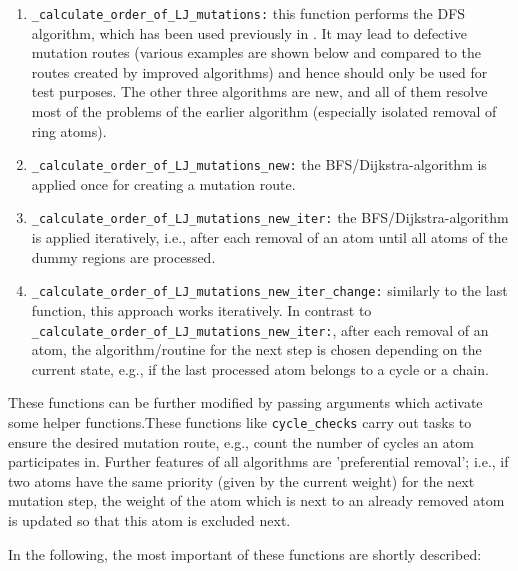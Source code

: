 \begin{enumerate}
\item \texttt{\_calculate\_order\_of\_LJ\_mutations:} this function performs the DFS algorithm, which has been used previously in {\trafo}. It may lead to  defective mutation routes (various examples are shown below and compared to the routes created by improved algorithms) and hence
should only be used for test purposes. The other three algorithms
are new, and all of them resolve most of the problems of the earlier
algorithm (especially isolated removal of ring atoms).


\item \texttt{\_calculate\_order\_of\_LJ\_mutations\_new:} the BFS/Dijkstra-algorithm is
applied once for creating a mutation route.

\item \texttt{\_calculate\_order\_of\_LJ\_mutations\_new\_iter:} the BFS/Dijkstra-algorithm is
applied iteratively, i.e., after each removal of an atom until all atoms of the dummy regions are processed.

\item \texttt{\_calculate\_order\_of\_LJ\_mutations\_new\_iter\_change:}
similarly to the last function, this approach works iteratively. In contrast to \texttt{\_calculate\_order\_of\_LJ\_mutations\_new\_iter:}, after each removal of an atom, the algorithm/routine for the next step is chosen depending on the current state, e.g., if the last processed atom belongs to a cycle or a chain.
\end{enumerate}

These functions
can be further modified by passing arguments which activate some helper
functions.These functions like \texttt{cycle\_checks} carry out tasks to ensure the
desired mutation route, e.g., count the number of cycles an atom participates
in. Further features of all algorithms are 'preferential removal';
i.e., if two atoms have the same priority (given by the current
weight) for the next mutation step, the weight of the atom which is
next to an already removed atom is updated so that this atom is excluded
next.

In the following, the most important of these functions are shortly described:


